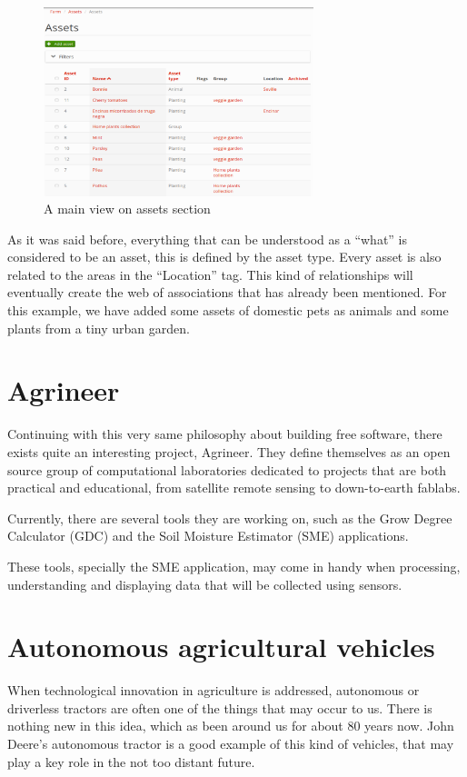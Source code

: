 \begin{figure}[htp]
    \centering
    \includegraphics[width=0.70\textwidth]{fig/assets.png}
    \caption{A main view on assets section}
    \label{fig:farmos}
\end{figure}
As it was said before, everything that can be understood as a ``what'' is considered to be an asset, this is defined by the asset type. Every asset is also related to the areas in the ``Location'' tag. This kind of relationships will eventually create the web of associations that has already been mentioned. For this example, we have added some assets of domestic pets as animals and some plants from a tiny urban garden.

\section{Agrineer}
Continuing with this very same philosophy about building free software, there exists quite an interesting project, Agrineer. They define themselves as an open source group of computational laboratories dedicated to projects that are both practical and educational, from satellite remote sensing to down-to-earth fablabs\cite{agrineer}.

Currently, there are several tools they are working on, such as the Grow Degree Calculator (GDC) and the Soil Moisture Estimator (SME) applications.

These tools, specially the SME application, may come in handy when processing, understanding and displaying data that will be collected using sensors.


\section{Autonomous agricultural vehicles}
When technological innovation in agriculture is addressed, autonomous or driverless tractors are often one of the things that may occur to us. There is nothing new in this idea, which as been around us for about 80 years now. John Deere's autonomous tractor\cite{deere-tractor} is a good example of this kind of vehicles, that may play a key role in the not too distant future.

